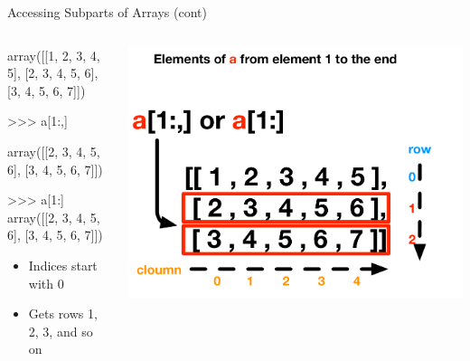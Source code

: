 \documentclass[aspectratio=169]{beamer}
\begin{document}
\begin{frame}[fragile]{Accessing Subparts of Arrays (cont)}

\begin{columns}
\begin{column}{0.5\textwidth}	
\begin{SQL}
array([[1, 2, 3, 4, 5],
       [2, 3, 4, 5, 6],
       [3, 4, 5, 6, 7]])

>>> a[1:,]

array([[2, 3, 4, 5, 6],
       [3, 4, 5, 6, 7]])

>>> a[1:]
array([[2, 3, 4, 5, 6],
       [3, 4, 5, 6, 7]])
\end{SQL}

\begin{itemize}
\item Indices start with 0
\item Gets rows 1, 2, 3, and so on
\end{itemize}
\end{column}

\begin{column}{0.5\textwidth}
{\centering\includegraphics[width=1\textwidth]{./lectPython/Canvas04.pdf}\par}	
\end{column}

\end{columns}
\end{frame}
\end{document}
